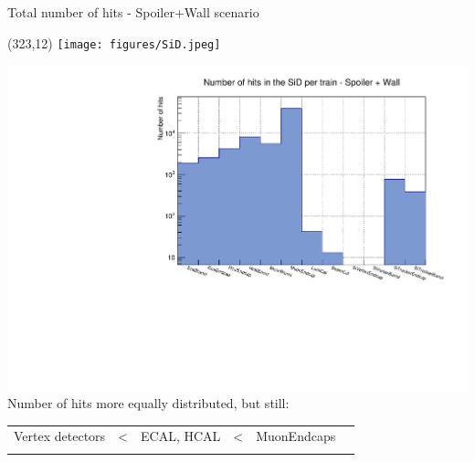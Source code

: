 \documentclass[xcolor={dvipsnames}]{beamer}
\newcommand{\sidlogo}{
  \setlength{\TPHorizModule}{1pt}
  \setlength{\TPVertModule}{1pt}
  \begin{textblock}{1}(323,12)
   \texttt{[image: figures/SiD.jpeg]}
  \end{textblock}
  }
\begin{document}
\begin{frame}{Total number of hits - \small Spoiler+Wall scenario}
\sidlogo
 \begin{center}
\includegraphics[height=0.65\textheight]{Number_Hits_per_Subdetector_SpoilerWall.pdf}\\
Number of hits more equally distributed, but still:\\
\begin{tabular}{@{}p{}p{}p{}p{}p{}p{}@{}}
 \centering Vertex detectors & < & \centering ECAL, HCAL & < & \centering MuonEndcaps & \\
  \centering{\scriptsize Smallest effective detector area} & &  \centering{\scriptsize Particle showers} & &  \centering{\scriptsize Biggest effective detector area}&
\end{tabular}
\end{center}
\end{frame}
\end{document}
